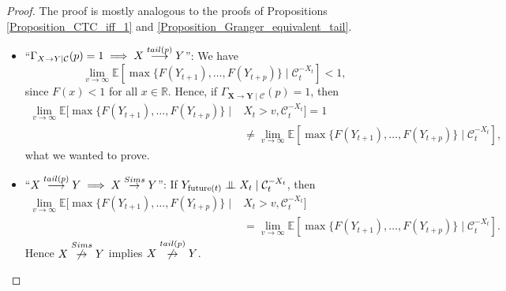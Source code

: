 \documentclass[a4paper,11pt]{article}
\newcommand{\indep}{\perp\kern-5.5pt\perp}
\newcommand{\toverset}[2]{\overset{{\rm #1}}{#2}}
\DeclareMathOperator{\future}{future}
\begin{document}
\begin{proof}
The proof is mostly analogous to the proofs of Propositions \ref{Proposition_CTC_iff_1} and \ref{Proposition_Granger_equivalent_tail}. 

\begin{itemize}
    \item ``$  \Gamma_{\textbf{X}\to\textbf{Y}\mid\mathcal{C}}(p) = 1 \implies \textbf{X}\overset{{\rm tail}(p)}{\longrightarrow}
 \textbf{Y} $'':  We have $$\lim_{v\to \infty}\mathbb{E}[\max\{F(Y_{t+1}), \dots, F(Y_{t+p})\}\mid \mathcal{C}^{-{X_t}}_t]< 1,$$
since $F(x)<1$ for all $x\in\mathbb{R}$. Hence, if   $\Gamma_{\textbf{X}\to\textbf{Y}\mid\mathcal{C}}(p) = 1$, then 
\begin{equation*}
    \begin{split}
\lim_{v\to \infty}\mathbb{E}[\max\{F(Y_{t+1}), \dots, F(Y_{t+p})\}\mid& X_t>v, \mathcal{C}^{-{X_t}}_t] = 1\\&\neq \lim_{v\to \infty}\mathbb{E}[\max\{F(Y_{t+1}), \dots, F(Y_{t+p})\}\mid \mathcal{C}^{-{X_t}}_t],        
    \end{split}
\end{equation*}
what we wanted to prove. 


\item``$\textbf{X}\overset{{\rm tail}(p)}{\longrightarrow}\textbf{Y} \implies \textbf{X}\toverset{Sims}{\to}\textbf{Y} $'': If   $\textbf{Y}_{\future(t)} \indep X_{t}\mid \mathcal{C}^{-{X_t}}_{t}$, then 
\begin{equation*}
    \begin{split}
\lim_{v\to \infty}\mathbb{E}[\max\{F(Y_{t+1}), \dots, F(Y_{t+p})\}\mid& X_t>v, \mathcal{C}^{-{X_t}}_t]\\&=     \lim_{v\to \infty}\mathbb{E}[\max\{F(Y_{t+1}), \dots, F(Y_{t+p})\}\mid \mathcal{C}^{-{X_t}}_t].        
    \end{split}
\end{equation*}
 Hence  $X\toverset{Sims}{\not\to}Y$ implies $X\overset{{\rm tail}(p)}{\not\to}Y$. 
\end{itemize}
\end{proof}
\end{document}
